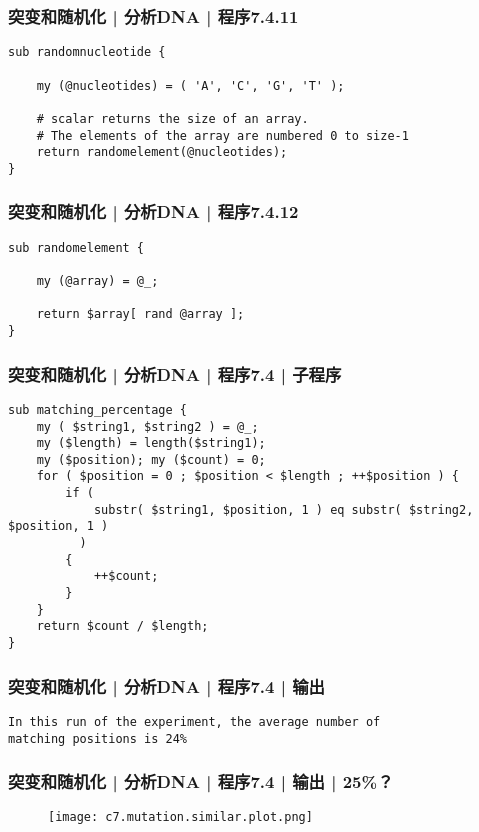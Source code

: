 \begin{frame}[fragile]
  \frametitle{突变和随机化 | 分析DNA | 程序7.4.11}
\begin{lstlisting}[firstnumber=168]
sub randomnucleotide {

    my (@nucleotides) = ( 'A', 'C', 'G', 'T' );

    # scalar returns the size of an array.
    # The elements of the array are numbered 0 to size-1
    return randomelement(@nucleotides);
}
\end{lstlisting}
\end{frame}

\begin{frame}[fragile]
  \frametitle{突变和随机化 | 分析DNA | 程序7.4.12}
\begin{lstlisting}[firstnumber=184]
sub randomelement {

    my (@array) = @_;

    return $array[ rand @array ];
}
\end{lstlisting}
\end{frame}

\begin{frame}[fragile]
  \frametitle{突变和随机化 | 分析DNA | 程序7.4 | \alert{子程序}}
\begin{lstlisting}
sub matching_percentage {
    my ( $string1, $string2 ) = @_;
    my ($length) = length($string1);
    my ($position); my ($count) = 0;
    for ( $position = 0 ; $position < $length ; ++$position ) {
        if (
            substr( $string1, $position, 1 ) eq substr( $string2, $position, 1 )
          )
        {
            ++$count;
        }
    }
    return $count / $length;
}
\end{lstlisting}
\end{frame}

\begin{frame}[fragile]
  \frametitle{突变和随机化 | 分析DNA | 程序7.4 | 输出}
\begin{lstlisting}[firstnumber=1]
In this run of the experiment, the average number of 
matching positions is 24%
\end{lstlisting}
\end{frame}

\begin{frame}
  \frametitle{突变和随机化 | 分析DNA | 程序7.4 | 输出 | 25\%？}
  \begin{figure}
    \centering
    \texttt{[image: c7.mutation.similar.plot.png]}
  \end{figure}
\end{frame}

